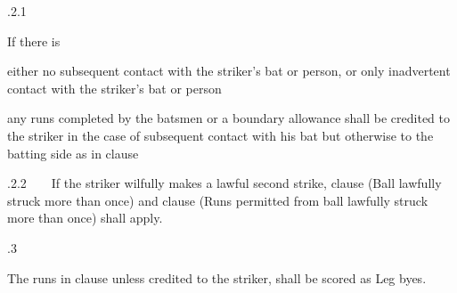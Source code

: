 \documentclass[12pt]{article}
\begin{document}
\vspace{\baselineskip}
\begin{adjustwidth}{0.49in}{0.0in}
{\fontsize{9pt}{10.8pt}.2.1 \tabto{1.17in} {\fontsize{8pt}{9.6pt}\selectfont If there is\par}\par}\par

\end{adjustwidth}


\vspace{\baselineskip}
\begin{adjustwidth}{1.12in}{1.89in}
{\fontsize{9pt}{10.8pt}\selectfont either no subsequent contact with the striker’s bat or person, or only inadvertent contact with the striker’s bat or person\par}\par

\end{adjustwidth}


\vspace{\baselineskip}
\begin{adjustwidth}{1.12in}{0.07in}
{\fontsize{9pt}{10.8pt}\selectfont any runs completed by the batsmen or a boundary allowance shall be credited to the striker in the case of subsequent contact with his bat but otherwise to the batting side as in clause \par}\par

\end{adjustwidth}


\vspace{\baselineskip}
\begin{adjustwidth}{0.49in}{0.22in}
\begin{FlushRight}
{\fontsize{9pt}{10.8pt}.2.2\ \ \ \  If the striker wilfully makes a lawful second strike, clause (Ball lawfully struck more than once) and clause (Runs permitted from ball lawfully struck more than once) shall apply.\par}
\end{FlushRight}\par

\end{adjustwidth}


\vspace{\baselineskip}
{\fontsize{9pt}{10.8pt}.3 \tabto{0.49in} {\fontsize{8pt}{9.6pt}\selectfont The runs in clause unless credited to the striker, shall be scored as Leg byes.\par}\par}\par
\end{document}
